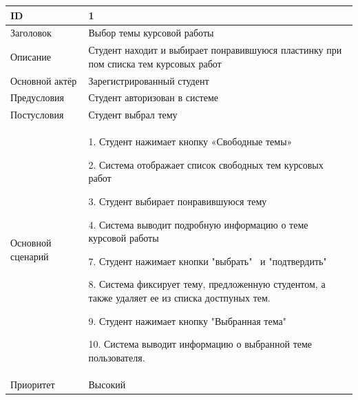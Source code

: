 \documentclass[14pt]{extarticle} %
\begin{document}
\begin{longtable}{|p{3cm}|p{14cm}|}
\hline
ID & 1 \\ \hline
Заголовок & Выбор темы курсовой работы\\ \hline
Описание & Студент находит и выбирает понравившуюся пластинку при пом списка тем курсовых работ\\ \hline
Основной актёр & Зарегистрированный студент\\ \hline
Предусловия & Студент авторизован в системе \\ \hline
Постусловия & Студент выбрал тему\\ \hline
Основной сценарий & 
1. Студент нажимает кнопку «Свободные темы»

2. Система отображает список свободных тем курсовых работ

3. Студент выбирает понравившуюся тему

4. Система выводит подробную информацию о теме курсовой работы

7. Студент нажимает кнопки "выбрать" \, и "подтвердить"

8. Система фиксирует тему, предложенную студентом, а также удаляет ее из списка достпуных тем.

9. Студент нажимает кнопку "Выбранная тема"

10. Система выводит информацию о выбранной теме пользователя.\\ \hline

Приоритет & Высокий
\\ \hline	
\end{longtable}
\end{document}
